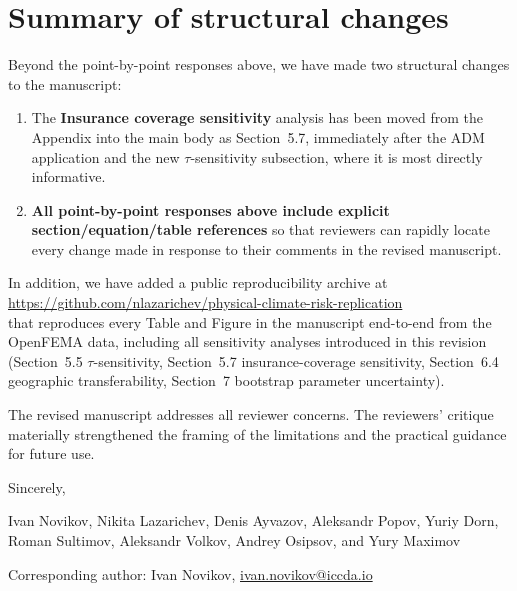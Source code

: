 \documentclass[11pt]{article}
\begin{document}
\section*{Summary of structural changes}

Beyond the point-by-point responses above, we have made two structural changes to the manuscript:

\begin{enumerate}
  \item The \textbf{Insurance coverage sensitivity} analysis has been moved from the Appendix into the main body as Section~5.7, immediately after the ADM application and the new $\tau$-sensitivity subsection, where it is most directly informative.
  \item \textbf{All point-by-point responses above include explicit section/equation/table references} so that reviewers can rapidly locate every change made in response to their comments in the revised manuscript.
\end{enumerate}

In addition, we have added a public reproducibility archive at\\
\url{https://github.com/nlazarichev/physical-climate-risk-replication}\\
that reproduces every Table and Figure in the manuscript end-to-end from the OpenFEMA data, including all sensitivity analyses introduced in this revision (Section~5.5 $\tau$-sensitivity, Section~5.7 insurance-coverage sensitivity, Section~6.4 geographic transferability, Section~7 bootstrap parameter uncertainty).

The revised manuscript addresses all reviewer concerns. The reviewers' critique materially strengthened the framing of the limitations and the practical guidance for future use.

\bigskip

\noindent Sincerely,

\noindent Ivan Novikov, Nikita Lazarichev, Denis Ayvazov, Aleksandr Popov, Yuriy Dorn, Roman Sultimov, Aleksandr Volkov, Andrey Osipsov, and Yury Maximov

\medskip

\noindent Corresponding author: Ivan Novikov, \href{mailto:ivan.novikov@iccda.io}{ivan.novikov@iccda.io}
\end{document}

